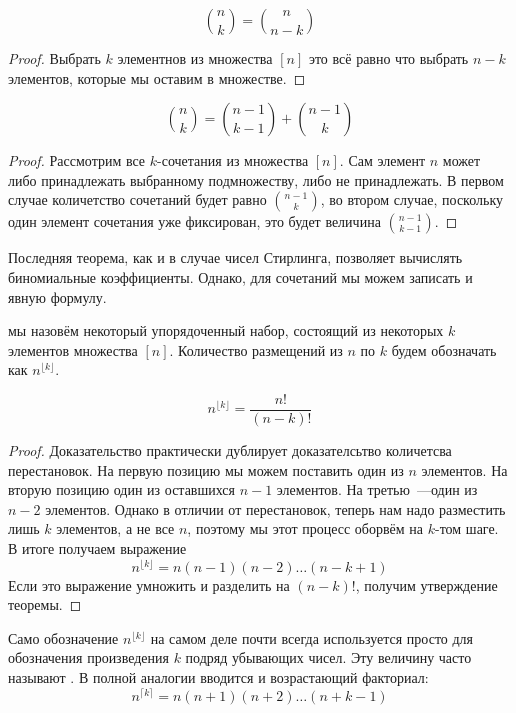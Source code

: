 \begin{thm}
$${n \choose k} = {n \choose n-k}$$
\end{thm}
\begin{proof}
Выбрать $k$ элементнов из множества $[n]$ это всё равно что выбрать $n-k$ элементов, которые мы оставим в множестве.
\end{proof}

\begin{thm}
$${n \choose k} = {n-1 \choose k-1} + {n - 1 \choose k}$$
\end{thm}

\begin{proof}
Рассмотрим все $k$-сочетания из множества $[n]$. Сам элемент $n$ может либо принадлежать выбранному подмножеству, либо не принадлежать. В первом случае количетство сочетаний будет равно $n-1\choose k$, во втором случае, поскольку один элемент сочетания уже фиксирован, это будет величина $n-1\choose k - 1$.
\end{proof}

Последняя теорема, как и в случае чисел Стирлинга, позволяет вычислять биномиальные коэффициенты. Однако, для сочетаний мы можем записать и явную формулу.

\begin{definition}
 мы назовём некоторый упорядоченный набор, состоящий из некоторых $k$ элементов множества $[n]$. Количество размещений из $n$ по $k$ будем обозначать как $n^{\lfloor k\rfloor}$.
\end{definition}

\begin{thm}
$$n^{\lfloor k \rfloor} = \frac{n!}{(n-k)!}$$
\end{thm}
\begin{proof}
Доказательство практически дублирует доказателсьтво количетсва перестановок. На первую позицию мы можем поставить один из $n$ элементов. На вторую позицию один из оставшихся $n-1$ элементов. На третью~---один из $n-2$ элементов. Однако в отличии от перестановок, теперь нам надо разместить лишь $k$ элементов, а не все $n$, поэтому мы этот процесс оборвём на $k$-том шаге. В итоге получаем выражение
$$n^{\lfloor k \rfloor} = n (n-1)  (n-2) \ldots (n-k+1)$$
Если это выражение умножить и разделить на $(n-k)!$, получим утверждение теоремы.
\end{proof}

Само обозначение $n^{\lfloor k \rfloor}$ на самом деле почти всегда используется просто для обозначения произведения $k$ подряд убывающих чисел. Эту величину часто называют . В полной аналогии вводится и возрастающий факториал:
$$n^{\lceil k \rceil} = n(n+1)(n+2)\ldots(n+k-1)$$

